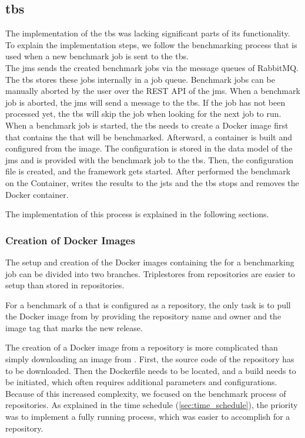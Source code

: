 \subsection{\acl{tbs}}
The implementation of the \acl{tbs} was lacking significant parts of its functionality.
To explain the implementation steps, we follow the benchmarking process that is used when a new benchmark job is sent to the \ac{tbs}.
\\

The \ac{jms} sends the created benchmark jobs via the message queues of RabbitMQ.
The \ac{tbs} stores these jobs internally in a job queue.
Benchmark jobs can be manually aborted by the user over the REST API of the \ac{jms}.
When a benchmark job is aborted, the \ac{jms} will send a message to the \ac{tbs}.
If the job has not been processed yet, the \ac{tbs} will skip the job when looking for the next job to run.
\\

When a benchmark job is started, the \ac{tbs} needs to create a Docker image first that contains the \ts{} that will be benchmarked.
Afterward, a container is built and configured from the image.
The configuration is stored in the data model of the \ac{jms} and is provided with the benchmark job to the \ac{tbs}.
Then, the \iguana{} configuration file is created, and the framework gets started.
After \iguana{} performed the benchmark on the Container, \iguana{} writes the results to the \ac{jsts} and the \ac{tbs} stops and removes the Docker container.

The implementation of this process is explained in the following sections.


\subsubsection{Creation of Docker Images}
The setup and creation of the Docker images containing the \ts{} for a benchmarking job can be divided into two branches.
Triplestores from \dockh{} repositories are easier to setup than \tsp{} stored in \gh{} repositories.

For a benchmark of a \ts{} that is configured as a \dockh{} repository, the only task is to pull the Docker image from \dockh{} by providing the repository name and owner and the image tag that marks the new release.

The creation of a Docker image from a \gh{} repository is more complicated than simply downloading an image from \dockh{}.
First, the source code of the repository has to be downloaded. 
Then the Dockerfile needs to be located, and a build needs to be initiated, which often requires additional parameters and configurations.
Because of this increased complexity, we focused on the benchmark process of \dockh{} repositories.
As explained in the time schedule (\ref{sec:time_schedule}), the priority was to implement a fully running process, which was easier to accomplish for a \dockh{} repository.
\\

